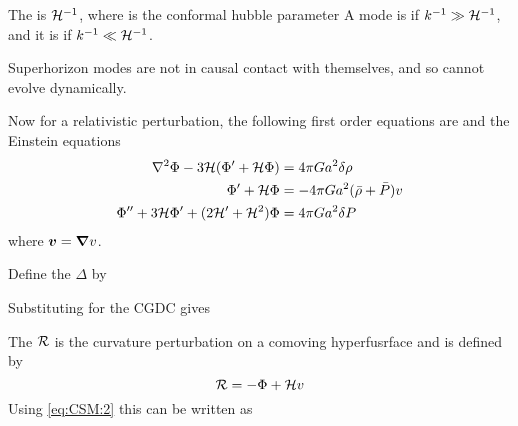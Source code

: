 \documentclass{article}
\begin{document}
\begin{definition}
The  is $\mathcal{H}^{-1}$, where
is the conformal hubble parameter
A mode is  if $k^{-1}\gg \mathcal{H}^{-1}$, and it is  if $k^{-1}\ll \mathcal{H}^{-1}$.
\end{definition}

\begin{fact}
Superhorizon modes are not in causal contact with themselves, and so cannot evolve dynamically. 
\end{fact}

Now for a relativistic perturbation, the following first order equations are 
and the Einstein equations 
\begin{align} \label{eq:CSM:2}
\nabla^2 \Phi - 3\mathcal{H}(\Phi^\prime + \mathcal{H}\Phi)  &= 4\pi G a^2 \delta \rho \\
\Phi^\prime + \mathcal{H}\Phi &= -4\pi G a^2 (\bar{\rho} + \bar{P}) v \\
\Phi^{\prime\prime} + 3 \mathcal{H} \Phi^\prime + (2\mathcal{H}^\prime + \mathcal{H}^2 ) \Phi &= 4\pi G a^2 \delta P 
\end{align}
where $\bm{v} = \bm{\nabla} v$.
\begin{definition}
Define the  $\Delta$ by
\end{definition}

Substituting for the CGDC gives 

\begin{definition}
The  $\mathcal{R}$ is the curvature perturbation on a comoving hyperfusrface and is defined by 
\[
\mathcal{R} = -\Phi + \mathcal{H}v
\]
Using \ref{eq:CSM:2} this can be written as 
\end{definition}
\end{document}
